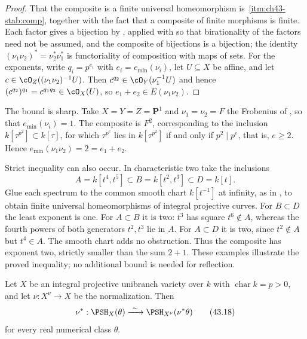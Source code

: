\begin{proof}
That the composite is a finite universal homeomorphism is
\,\cref{itm:ch43-stab:comp}, together with the
fact that a composite of finite morphisms is finite.  Each factor gives a
bijection by , applied with
 so that birationality of the
factors need not be assumed, and the composite of bijections is a bijection;
the identity $(\nu_1\nu_2)^*=\nu_2^*\nu_1^*$ is functoriality of
composition with maps of sets.  For the exponents, write $q_i=p^{e_i}$ with
$e_i=e_{\min}(\nu_i)$, let $U\subseteq X$ be affine, and let
$c\in\cO_Z(( \nu_1\nu_2)^{-1}U)$.  Then $c^{q_2}\in\cO_Y(\nu_1^{-1}U)$
and hence $(c^{q_2})^{q_1}=c^{q_1q_2}\in\cO_X(U)$, so
$e_1+e_2\in E(\nu_1\nu_2)$.
\end{proof}

\begin{remark}
\label{rem:ch43-tower-exponent-strict}
The bound is sharp.  Take $X=Y=Z=\mathbf P^1$ and
$\nu_1=\nu_2=F$ the Frobenius of , so that
$e_{\min}(\nu_i)=1$.  The composite is $F^2$, corresponding to the
inclusion $k[\tau^{p^2}]\subset k[\tau]$, for which $\tau^{p^e}$ lies in
$k[\tau^{p^2}]$ if and only if $p^2\mid p^e$, that is, $e\ge2$.  Hence
$e_{\min}(\nu_1\nu_2)=2=e_1+e_2$.

Strict inequality can also occur.  In characteristic two take the
inclusions
\[
 A=k[t^4,t^5]\subset B=k[t^2,t^3]\subset D=k[t].
\]
Glue each spectrum to the common smooth chart $k[t^{-1}]$ at infinity,
as in , to obtain finite universal
homeomorphisms of integral projective curves.
For $B\subset D$ the least exponent is one.
For $A\subset B$ it is two: $t^3$ has square $t^6\notin A$, whereas
the fourth powers of both generators $t^2,t^3$ lie in $A$.
For $A\subset D$ it is two, since $t^2\notin A$ but $t^4\in A$.
The smooth chart adds no obstruction.  Thus the composite has exponent
two, strictly smaller than the sum $2+1$.
These examples illustrate the proved inequality; no additional
bound is needed for reflection.
\end{remark}

\begin{corollary}\label{cor:bj-positive-normalization-reflection}
Let $X$ be an integral projective unibranch variety over $k$ with
$\operatorname{char}k=p>0$, and let
$\nu:X^\nu\to X$ be the normalization.
Then
\[
 \nu^*:\PSH_X(\theta)
       \xrightarrow{\ \sim\ }
       \PSH_{X^\nu}(\nu^*\theta)
\tag{43.18}\label{eq:bj-positive-normalization-reflection}
\]
for every real numerical class $\theta$.
\end{corollary}

